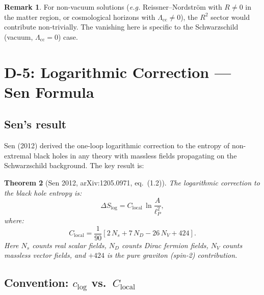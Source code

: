 \documentclass[11pt,a4paper]{article}
\newcommand{\eg}{\textit{e.g.}}
\newcommand{\lP}{\ell_P}
\theoremstyle{plain}
\newtheorem{theorem}{Theorem}[section]
\theoremstyle{definition}
\newtheorem{remark}[theorem]{Remark}
\begin{document}
\begin{remark}
For non-vacuum solutions (\eg{} Reissner--Nordstr\"om with $R \neq 0$ in the
matter region, or cosmological horizons with $\Lambda_{\mathrm{cc}} \neq 0$),
the $R^2$ sector would contribute non-trivially. The vanishing here is
specific to the Schwarzschild (vacuum, $\Lambda_{\mathrm{cc}} = 0$) case.
\end{remark}


\section{D-5: Logarithmic Correction --- Sen Formula}
\label{sec:D5}

\subsection{Sen's result}

Sen (2012) derived the one-loop logarithmic correction to the entropy
of non-extremal black holes in any theory with massless fields
propagating on the Schwarzschild background. The key result is:

\begin{theorem}[Sen 2012, arXiv:1205.0971, eq.~(1.2)]\label{thm:sen}
The logarithmic correction to the black hole entropy is:
\begin{equation}\label{eq:sen-Clocal}
  \Delta S_{\log} = C_{\mathrm{local}}\,\ln\frac{A}{\lP^2},
\end{equation}
where:
\begin{equation}\label{eq:Clocal-sen}
  C_{\mathrm{local}} = \frac{1}{90}\left[
    2\,N_s + 7\,N_D - 26\,N_V + 424
  \right].
\end{equation}
Here $N_s$ counts real scalar fields, $N_D$ counts Dirac fermion fields,
$N_V$ counts massless vector fields, and $+424$ is the pure graviton
(spin-2) contribution.
\end{theorem}

\subsection{Convention: $c_{\log}$ vs.\ $C_{\mathrm{local}}$}
\end{document}
